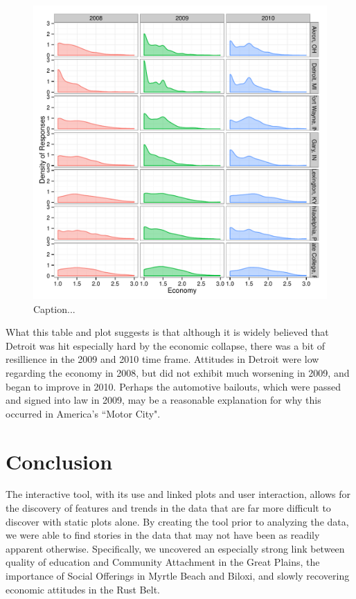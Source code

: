 \documentclass[11pt]{article}\usepackage{knitr}
\begin{document}
\begin{knitrout}
\color{fgcolor}\begin{figure}[H]


{\centering \includegraphics[width=\maxwidth]{figure/rb_one} 

}

\caption[Caption]{Caption...\label{fig:rb_one}}
\end{figure}


\end{knitrout}


What this table and plot suggests is that although it is widely believed that Detroit was hit especially hard by the economic collapse, there was a bit of resillience in the 2009 and 2010 time frame. Attitudes in Detroit were low regarding the economy in 2008, but did not exhibit much worsening in 2009, and began to improve in 2010. Perhaps the automotive bailouts, which were passed and signed into law in 2009, may be a reasonable explanation for why this occurred in America's ``Motor City".


\section*{Conclusion}

The interactive tool, with its use and linked plots and user interaction, allows for the discovery of features and trends in the data that are far more difficult to discover with static plots alone. By creating the tool prior to analyzing the data, we were able to find stories in the data that may not have been as readily apparent otherwise. Specifically, we uncovered an especially strong link between quality of education and Community Attachment in the Great Plains, the importance of Social Offerings in Myrtle Beach and Biloxi, and slowly recovering economic attitudes in the Rust Belt.
\end{document}
